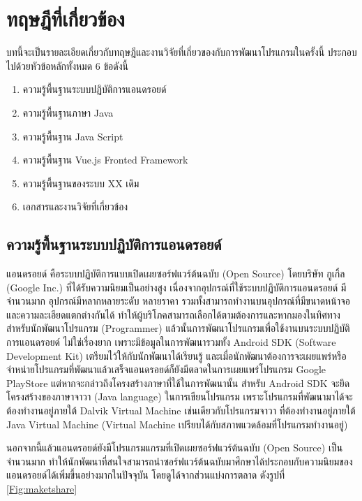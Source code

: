 \chapter{ทฤษฎีที่เกี่ยวข้อง}
บทนี้จะเป็นรายละเอียดเกี่ยวกับทฤษฎีและงานวิจัยที่เกี่ยวของกับการพัฒนาโปรแกรมในครั้งนี้ ประกอบไปด้วยหัวข้อหลักทั้งหมด 6 ข้อดังนี้
\begin{enumerate}[label=2.\arabic*]
	\item ความรู้พื้นฐานระบบปฏิบัติการแอนดรอยด์
	\item ความรู้พื้นฐานภาษา Java
	\item ความรู้พื้นฐาน Java Script
	\item ความรู้พื้นฐาน Vue.js Fronted Framework
	\item ความรู้พื้นฐานของระบบ XX เดิม
	\item เอกสารและงานวิจัยที่เกี่ยวข้อง
\end{enumerate}

\section{ความรู้พื้นฐานระบบปฏิบัติการแอนดรอยด์}
	แอนดรอยด์ \cite{bib1} คือระบบปฏิบัติการแบบเปิดเผยซอร์ฟแวร์ต้นฉบับ (Open Source) โดยบริษัท กูเกิ้ล (Google Inc.) ที่ได้รับความนิยมเป็นอย่างสูง เนื่องจากอุปกรณ์ที่ใช้ระบบปฏิบัติการแอนดรอยด์ มีจำนวนมาก อุปกรณ์มีหลากหลายระดับ หลายราคา รวมทั้งสามารถทำงานบนอุปกรณ์ที่มีขนาดหน้าจอ และความละเอียดแตกต่างกันได้ ทำให้ผู้บริโภคสามารถเลือกได้ตามต้องการและหากมองในทิศทางสำหรับนักพัฒนาโปรแกรม (Programmer) แล้วนั้นการพัฒนาโปรแกรมเพื่อใช้งานบนระบบปฏิบัติการแอนดรอยด์ ไม่ใช่เรื่องยาก เพราะมีข้อมูลในการพัฒนารวมทั้ง Android SDK (Software Development Kit) เตรียมไว้ให้กับนักพัฒนาได้เรียนรู้ และเมื่อนักพัฒนาต้องการจะเผยแพร่หรือจำหน่ายโปรแกรมที่พัฒนาแล้วเสร็จแอนดรอยด์ก็ยังมีตลาดในการเผยแพร่โปรแกรม Google PlayStore แต่หากจะกล่าวถึงโครงสร้างภาษาที่ใช้ในการพัฒนานั้น สำหรับ Android SDK จะยึดโครงสร้างของภาษาจาวา (Java language) ในการเขียนโปรแกรม เพราะโปรแกรมที่พัฒนามาได้จะต้องทำงานอยู่ภายใต้ Dalvik Virtual Machine เช่นเดียวกับโปรแกรมจาวา ที่ต้องทำงานอยู่ภายใต้ Java Virtual Machine (Virtual Machine เปรียบได้กับสภาพแวดล้อมที่โปรแกรมทำงานอยู่)
	
	นอกจากนี้แล้วแอนดรอยด์ยังมีโปรแกรมแกรมที่เปิดเผยซอร์ฟแวร์ต้นฉบับ (Open Source) เป็นจำนวนมาก ทำให้นักพัฒนาที่สนใจสามารถนำซอร์ฟแวร์ต้นฉบับมาศึกษาได้ประกอบกับความนิยมของแอนดรอยด์ได้เพิ่มขึ้นอย่างมากในปัจจุบัน โดยดูได้จากส่วนแบ่งการตลาด ดังรูปที่ \ref{Fig:maketshare}
	
